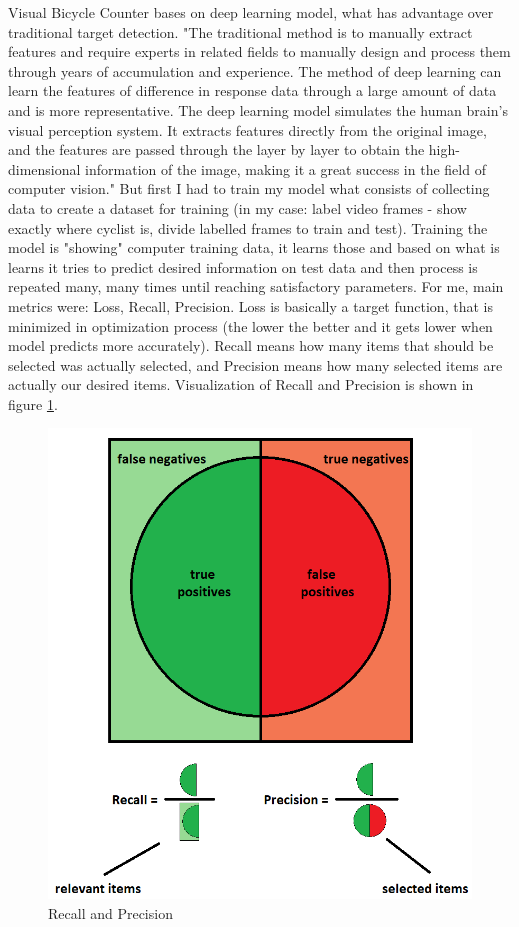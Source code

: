 Visual Bicycle Counter bases on deep learning model, what has advantage over traditional target detection. "The traditional method is to manually extract features and require experts in related fields to manually design and process them through years of accumulation and experience. The method of deep learning can learn the features of difference in response data through a large amount of data and is more representative. The deep learning model simulates the human brain's visual perception system. It extracts features directly from the original image, and the features are passed through the layer by layer to obtain the high-dimensional information of the image, making it a great success in the field of computer vision."\cite{deepLearning} But first I had to train my model what consists of collecting data to create a dataset for training (in my case: label video frames - show exactly where cyclist is, divide labelled frames to train and test). Training the model is "showing" computer training data, it learns those and based on what is learns it tries to predict desired information on test data and then process is repeated many, many times until reaching satisfactory parameters. For me, main metrics were: Loss, Recall, Precision. Loss is basically a target function, that is minimized in optimization process (the lower the better and it gets lower when model predicts more accurately). Recall means how many items that should be selected was actually selected, and Precision means how many selected items are actually our desired items. Visualization of Recall and Precision is shown in figure \ref{fig:RPL}.

\begin{figure}[H]
    \centering
    \includegraphics[scale=0.5]{images/rpl}
    \caption{Recall and Precision}
    \label{fig:RPL}
\end{figure}


